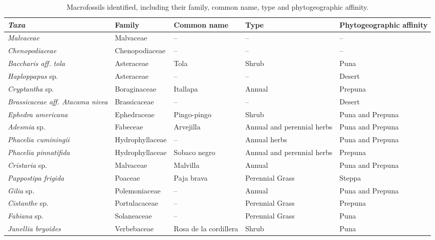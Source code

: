 \documentclass{article}
\begin{document}
\begin{table}[ht]
\centering
\begin{adjustbox}{max width=\textwidth}
\begin{large}
\begin{tabular}{@{}LLLLL@{}}
\toprule
\textbf{\textit{Taxa}} & \textbf{Family} & \textbf{Common name} & \textbf{Type} & \textbf{Phytogeographic affinity} \\ \midrule
\textit{Malvaceae} & Malvaceae & -- & -- & -- \\
\textit{Chenopodiaceae} & Chenopodiaceae & -- & -- & -- \\
\textit{Baccharis aff. tola} & Asteraceae & Tola & Shrub & Puna \\
\textit{Haploppapus} sp. & Asteraceae & -- & -- & Desert \\
\textit{Cryptantha} sp. & Boraginaceae & Itallapa & Annual & Prepuna \\
\textit{Brassicaceae aff. Atacama nivea} & Brassicaceae & -- & -- & Desert \\
\textit{Ephedra americana} & Ephedraceae & Pingo-pingo & Shrub & Puna and Prepuna \\
\textit{Adesmia} sp. & Fabeceae & Arvejilla & Annual and perennial herbs & Puna and Prepuna \\
\textit{Phacelia cuminingii} & Hydrophyllaceae & -- & Annual herbs & Puna and Prepuna \\
\textit{Phacelia pinnatifida} & Hydrophyllaceae & Sobaco negro & Annual and perennial herbs & Prepuna \\
\textit{Cristaria} sp. & Malvaceae & Malvilla & Annual & Puna and Prepuna \\
\textit{Pappostipa frigida} & Poaceae & Paja brava & Perennial Grass & Steppa \\
\textit{Gilia} sp. & Polemoniaceae & -- & Annual & Puna and Prepuna \\
\textit{Cistanthe} sp. & Portulacaceae & -- & Perennial Grass & Prepuna \\
\textit{Fabiana} sp. & Solaneaceae & -- & Perennial Grass & Puna \\
\textit{Junellia bryoides} & Verbebaceae & Rosa de la cordillera & Shrub & Puna \\ \bottomrule
\end{tabular}
\end{large}
\end{adjustbox}
\caption{Macrofossils identified, including their family, common name, type and phytogeographic affinity.}
\end{table}
\end{document}
